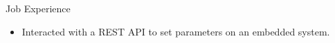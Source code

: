 \begin{rubric}{Job Experience}
\begin{itemize}[leftmargin=*, rightmargin=1cm]
	\item Interacted with a REST API to set parameters on an embedded system.
\end{itemize}
\begin{comment}
%
%
\entry*[] \textbf{Creative Edge LLC} \hfill 08.2017 -- 09.2018 \newline
\textit{Software Engineer} \hfill Denver, USA \newline
\vspace{\CVItemizeHeaderSpacing} \begin{itemize}[leftmargin=*, rightmargin=1cm]
	\setlength{\itemsep}{\CVItemizeSpacing}
	\item Developed applications for cryptocurrency mining in both Windows and Linux.  
	\item Wrote software managing OS drivers, system configurations, and 3rd party tools.
\end{itemize}
\end{comment}
\end{rubric}
